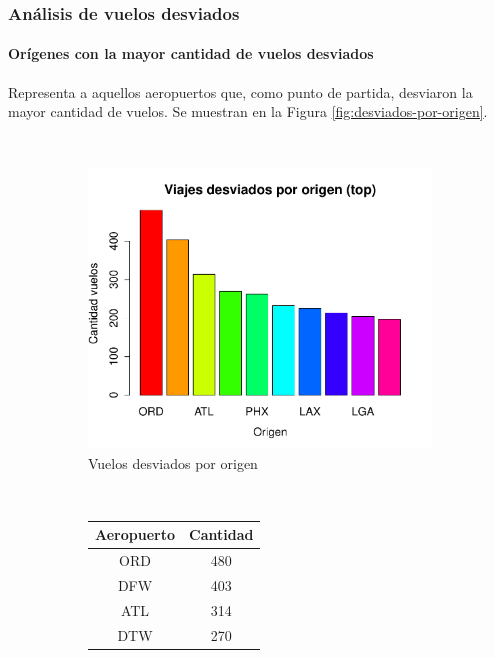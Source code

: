 \documentclass[12pt]{article}
\numberwithin{equation}{section}
\numberwithin{table}{section}
\numberwithin{figure}{section}
\begin{document}
\subsubsection{Análisis de vuelos desviados}

\paragraph{Orígenes con la mayor cantidad de vuelos desviados}
Representa a aquellos aeropuertos que, como punto de partida, desviaron la mayor cantidad de vuelos. Se muestran en la Figura \ref{fig:desviados-por-origen}.

\begin{figure}
        \centering
        ~
        \begin{subfigure}[b]{0.6\textwidth}
                \includegraphics[width=1\columnwidth]{imagenes/desviados/viajes-desviados-por-origen-top}
                \caption{Vuelos desviados por origen}
        \end{subfigure}
        ~
        \begin{subfigure}[b]{0.3\textwidth}
\begin{tabular}{@{}cc@{}}
\toprule
\textbf{Aeropuerto} & \textbf{Cantidad} \\ \midrule
ORD                 & 480               \\
DFW                 & 403               \\
ATL                 & 314               \\
DTW                 & 270               \\

\end{tabular}
\end{subfigure}
\end{figure}
\end{document}
